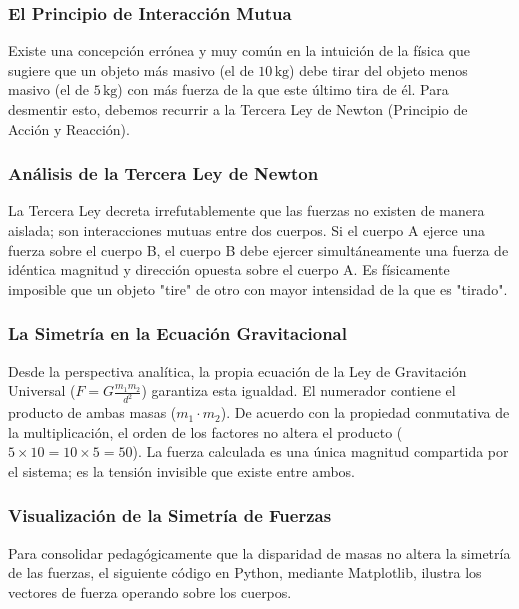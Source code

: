 \documentclass[12pt]{article}
\begin{document}
\subsubsection*{El Principio de Interacción Mutua}
Existe una concepción errónea y muy común en la intuición de la física que sugiere que un objeto más masivo (el de $10 \, \text{kg}$) debe tirar del objeto menos masivo (el de $5 \, \text{kg}$) con más fuerza de la que este último tira de él. Para desmentir esto, debemos recurrir a la Tercera Ley de Newton (Principio de Acción y Reacción). 

\subsubsection*{Análisis de la Tercera Ley de Newton}
La Tercera Ley decreta irrefutablemente que las fuerzas no existen de manera aislada; son interacciones mutuas entre dos cuerpos. Si el cuerpo A ejerce una fuerza sobre el cuerpo B, el cuerpo B debe ejercer simultáneamente una fuerza de idéntica magnitud y dirección opuesta sobre el cuerpo A. Es físicamente imposible que un objeto "tire" de otro con mayor intensidad de la que es "tirado".

\subsubsection*{La Simetría en la Ecuación Gravitacional}
Desde la perspectiva analítica, la propia ecuación de la Ley de Gravitación Universal ($F = G \frac{m_1 m_2}{d^2}$) garantiza esta igualdad. El numerador contiene el producto de ambas masas ($m_1 \cdot m_2$). De acuerdo con la propiedad conmutativa de la multiplicación, el orden de los factores no altera el producto ($5 \times 10 = 10 \times 5 = 50$). La fuerza calculada es una única magnitud compartida por el sistema; es la tensión invisible que existe entre ambos.

\subsubsection*{Visualización de la Simetría de Fuerzas}
Para consolidar pedagógicamente que la disparidad de masas no altera la simetría de las fuerzas, el siguiente código en Python, mediante Matplotlib, ilustra los vectores de fuerza operando sobre los cuerpos. 
\end{document}
